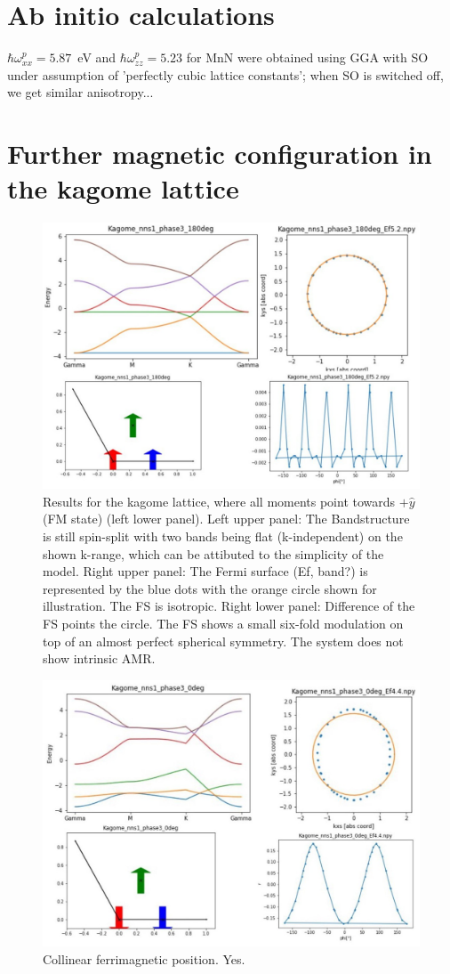 \documentclass[prb,showpacs,amsmath,amssymb,superscriptaddress,twocolumn,floatfix]{revtex4-1}
\begin{document}
\begin{appendix}

\section{Ab initio calculations}

$\hbar\omega^p_{xx}=5.87$~eV and $\hbar\omega^p_{zz}=5.23$ for MnN
were obtained using GGA with SO under assumption of 'perfectly cubic
lattice constants'; when SO is switched off, we get  similar anisotropy...

\section{Further magnetic configuration in the kagome lattice}

\begin{figure}
	\centering
	\includegraphics[width=0.7\linewidth]{img_total/total_Kagome_phase3_180}
	\caption{Results for the kagome lattice, where all moments point towards $+\hat{y}$ (FM state) (left lower panel). Left upper panel: The Bandstructure is still spin-split with two bands being flat (k-independent) on the shown k-range, which can be attibuted to the simplicity of the model. Right upper panel: The Fermi surface {\color{red} (Ef, band?)} is represented by the blue dots with the orange circle shown for illustration. The FS is isotropic. Right lower panel: Difference of the FS points the circle. The FS shows a small six-fold modulation on top of an almost perfect spherical symmetry. The system does not show intrinsic AMR.}
	\label{fig:totalkagomephase3180}
\end{figure}

\begin{figure}
	\centering
	\includegraphics[width=0.7\linewidth]{img_total/total_Kagome_phase3_0}
	\caption{Collinear ferrimagnetic position. Yes.}
	\label{fig:totalkagomephase30}
\end{figure}


\end{appendix}
\end{document}
